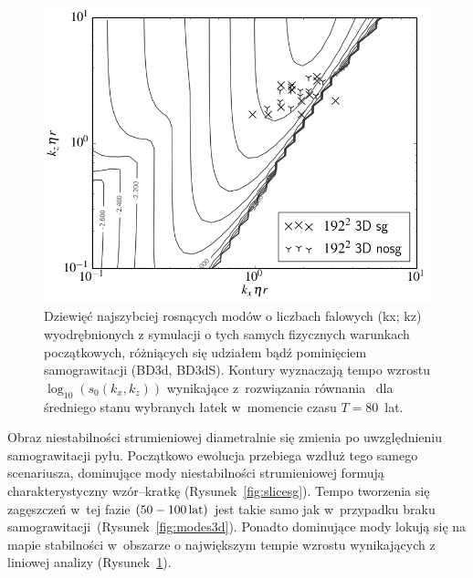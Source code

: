 %
\begin{figure}[h]
   \centering
   \includegraphics[width=0.5\linewidth]{figures/3d_map_x3_50.png}
   \caption{
      Dziewięć najszybciej rosnących modów o liczbach falowych (kx; kz)
      wyodrębnionych z symulacji o tych samych fizycznych warunkach
      początkowych, różniących się udziałem bądź pominięciem
      samograwitacji (BD3d, BD3dS).  Kontury wyznaczają tempo wzrostu
      $\log_{10}(s_0(k_x, k_z))$ wynikające z~rozwiązania równania~
       dla średniego stanu wybranych łatek w~momencie
      czasu $T = 80$~lat.}
   \label{fig:map3d}
\end{figure}
Obraz niestabilności strumieniowej diametralnie się zmienia po
uwzględnieniu samograwitacji pyłu. Początkowo ewolucja przebiega wzdłuż tego
samego scenariusza, dominujące mody niestabilności strumieniowej formują
charakterystyczny wzór--kratkę (Rysunek~\ref{fig:slicesg}). Tempo tworzenia się
zagęszczeń w~tej fazie $(50 - 100\hbox{$\thinspace\textrm{lat}$})$ jest takie samo jak w~przypadku braku
samograwitacji~(Rysunek~\ref{fig:modes3d}). Ponadto dominujące mody lokują się
na mapie stabilności w~obszarze o największym tempie wzrostu wynikających z
liniowej analizy (Rysunek~\ref{fig:map3d}).
%
